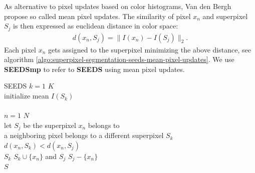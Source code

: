 As alternative to pixel updates based on color histograms, Van den Bergh \etal \cite{VanDenBerghBoixRoigCapitaniVanGool:2012} propose so called mean pixel updates. The similarity of pixel $x_n$ and superpixel $S_j$ is then expressed as euclidean distance in color space:
\begin{align}
	\label{eq:superpixel-segmentation-seeds-distance}
	d(x_n,S_j) = \| I(x_n) - I(S_j)\|_2.
\end{align}
Each pixel $x_n$ gets assigned to the superpixel minimizing the above distance, see algorithm \ref{algo:superpixel-segmentation-seeds-mean-pixel-updates}. We use \textbf{SEEDSmp} to refer to \textbf{SEEDS} using mean pixel updates.
\begin{algorithm}[t]
	\begin{algo}{SEEDS}{\label{algo:superpixel-segmentation-seeds-mean-pixel-updates}}
		\qfor $k = 1$ \qto $K$\\
			initialize mean $I(S_k)$\qrof\\
		\\
		\qfor $n = 1$ \qto $N$\\
			let $S_j$ be the superpixel $x_n$ belongs to\\
			\qif a neighboring pixel belongs to a different superpixel $S_k$\\
				\qthen\qif $d(x_n, S_k) < d(x_n, S_j)$\label{line:superpixel-segmentation-seeds-mean-pixel-criterion}\\
					\qthen $S_k$ \qlet $S_k \cup \{x_n\}$ and $S_j$ \qlet $S_j - \{x_n\}$\qfi\qfi\qrof\\
		\qreturn $S$
	\end{algo}
	\caption[As alternative to pixel updates as described in algorithm \ref{algo:superpixel-segmentation-seeds}, Van den Bergh \etal \cite{VanDenBerghBoixRoigVanGool:2013} propose mean pixel updates.]{As alternative to pixel updates as described in algorithm \ref{algo:superpixel-segmentation-seeds}, Van den Bergh \etal \cite{VanDenBerghBoixRoigVanGool:2013} propose mean pixel updates. This variant of \textbf{SEEDS} is referred to as \textbf{SEEDSmp}.}
	\label{fig:superpixel-segmentation-seeds-mean-pixel-updates}
\end{algorithm}

